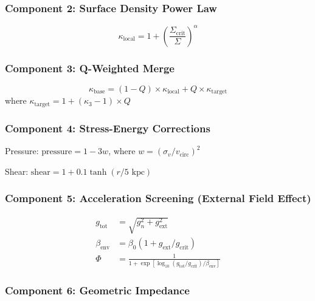 \documentclass[11pt,a4paper]{article}
\theoremstyle{definition}
\theoremstyle{remark}
\begin{document}
	\subsubsection{Component 2: Surface Density Power Law}
	
	\begin{equation}
		\kappa_{\text{local}} = 1 + \left(\frac{\Sigma_{\text{crit}}}{\Sigma}\right)^{\alpha}
		\label{eq:kappa_local}
	\end{equation}
	
	\subsubsection{Component 3: Q-Weighted Merge}
	
	\begin{equation}
		\kappa_{\text{base}} = (1-Q) \times \kappa_{\text{local}} + Q \times \kappa_{\text{target}}
		\label{eq:kappa_base}
	\end{equation}
	where $\kappa_{\text{target}} = 1 + (\kappa_3 - 1) \times Q$
	
	\subsubsection{Component 4: Stress-Energy Corrections}
	
	Pressure: $\text{pressure} = 1 - 3w$, where $w = (\sigma_v/v_{\text{circ}})^2$
	
	Shear: $\text{shear} = 1 + 0.1 \tanh(r/5\text{ kpc})$
	
	\subsubsection{Component 5: Acceleration Screening (External Field Effect)}
	
	\begin{align}
		g_{\text{tot}} &= \sqrt{g_n^2 + g_{\text{ext}}^2} \label{eq:g_tot} \\
		\beta_{\text{env}} &= \beta_0(1 + g_{\text{ext}}/g_{\text{crit}}) \label{eq:beta_env} \\
		\Phi &= \frac{1}{1 + \exp[\log_{10}(g_{\text{tot}}/g_{\text{crit}})/\beta_{\text{env}}]} \label{eq:phi_screening}
	\end{align}
	
	\subsubsection{Component 6: Geometric Impedance}
	
\end{document}
